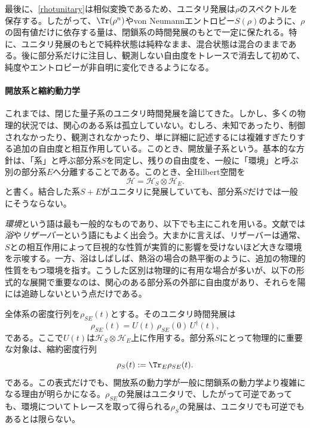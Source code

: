 \documentclass[a4paper,11pt,oneside]{article}
\theoremstyle{definition}
\numberwithin{equation}{section}
\begin{document}
最後に、\eqref{rhotunitary}は相似変換であるため、ユニタリ発展は$\rho$のスペクトルを保存する。したがって、$\Tr(\rho^n)$やvon Neumannエントロピー$S(\rho)$のように、$\rho$の固有値だけに依存する量は、閉鎖系の時間発展のもとで一定に保たれる。特に、ユニタリ発展のもとで純粋状態は純粋なまま、混合状態は混合のままである。後に部分系だけに注目し、観測しない自由度をトレースで消去して初めて、純度やエントロピーが非自明に変化できるようになる。





\paragraph{開放系と縮約動力学}



これまでは、閉じた量子系のユニタリ時間発展を論じてきた。しかし、多くの物理的状況では、関心のある系は孤立していない。むしろ、未知であったり、制御されなかったり、観測されなかったり、単に詳細に記述するには複雑すぎたりする追加の自由度と相互作用している。このとき、開放量子系という。基本的な方針は、「系」と呼ぶ部分系$S$を同定し、残りの自由度を、一般に「環境」と呼ぶ別の部分系$E$へ分離することである。このとき、全Hilbert空間を
\begin{equation}
\mathcal H = \mathcal H_S \otimes \mathcal H_E .
\end{equation}
と書く。結合した系$S+E$がユニタリに発展していても、部分系$S$だけでは一般にそうならない。



\textit{環境}という語は最も一般的なものであり、以下でも主にこれを用いる。文献では\textit{浴}や\textit{リザーバー}という語にもよく出会う。大まかに言えば、リザーバーは通常、$S$との相互作用によって巨視的な性質が実質的に影響を受けないほど大きな環境を示唆する。一方、浴はしばしば、熱浴の場合の熱平衡のように、追加の物理的性質をもつ環境を指す。こうした区別は物理的に有用な場合が多いが、以下の形式的な展開で重要なのは、関心のある部分系の外部に自由度があり、それらを陽には追跡しないという点だけである。



全体系の密度行列を$\rho_{SE}(t)$とする。そのユニタリ時間発展は
\begin{equation}
\rho_{SE}(t) = U(t)\,\rho_{SE}(0)\,U^\dagger(t) ,
\end{equation}
である。ここで$U(t)$は$\mathcal H_S\otimes \mathcal H_E$上に作用する。部分系$S$にとって物理的に重要な対象は、縮約密度行列
\begin{equation}
\rho_S(t) := \Tr_E \rho_{SE}(t) .
\end{equation}
である。この表式だけでも、開放系の動力学が一般に閉鎖系の動力学より複雑になる理由が明らかになる。$\rho_{SE}$の発展はユニタリで、したがって可逆であっても、環境についてトレースを取って得られる$\rho_S$の発展は、ユニタリでも可逆でもあるとは限らない。
\end{document}

